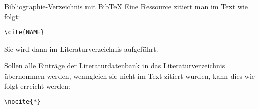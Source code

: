 \begin{frame}[fragile]{Bibliographie-Verzeichnis mit Bib\TeX}
Eine Ressource zitiert man im Text wie folgt:
\begin{lstlisting}[style=tex]
\cite{NAME}
\end{lstlisting}
Sie wird dann im Literaturverzeichnis aufgeführt.\pause

\bigskip
Sollen alle Einträge der Literaturdatenbank in das Literaturverzeichnis übernommen
werden, wenngleich sie nicht im Text zitiert wurden, kann dies wie folgt erreicht werden:
\begin{lstlisting}[style=tex]
\nocite{*}
\end{lstlisting}
\end{frame}